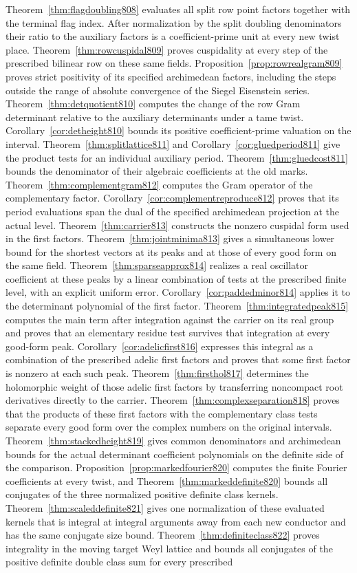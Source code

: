 \documentclass[a4paper,11pt]{article}
\theoremstyle{definition}
\theoremstyle{remark}
\numberwithin{equation}{section}
\begin{document}
Theorem~\ref{thm:flagdoubling808} evaluates all split row point factors together with the terminal flag index. After normalization by the split doubling denominators their ratio to the auxiliary factors is a coefficient-prime unit at every new twist place. Theorem~\ref{thm:rowcuspidal809} proves cuspidality at every step of the prescribed bilinear row on these same fields. Proposition~\ref{prop:rowrealgram809} proves strict positivity of its specified archimedean factors, including the steps outside the range of absolute convergence of the Siegel Eisenstein series. Theorem~\ref{thm:detquotient810} computes the change of the row Gram determinant relative to the auxiliary determinants under a tame twist. Corollary~\ref{cor:detheight810} bounds its positive coefficient-prime valuation on the interval. Theorem~\ref{thm:splitlattice811} and Corollary~\ref{cor:gluedperiod811} give the product tests for an individual auxiliary period. Theorem~\ref{thm:gluedcost811} bounds the denominator of their algebraic coefficients at the old marks. Theorem~\ref{thm:complementgram812} computes the Gram operator of the complementary factor. Corollary~\ref{cor:complementreproduce812} proves that its period evaluations span the dual of the specified archimedean projection at the actual level. Theorem~\ref{thm:carrier813} constructs the nonzero cuspidal form used in the first factors. Theorem~\ref{thm:jointminima813} gives a simultaneous lower bound for the shortest vectors at its peaks and at those of every good form on the same field. Theorem~\ref{thm:sparseapprox814} realizes a real oscillator coefficient at these peaks by a linear combination of tests at the prescribed finite level, with an explicit uniform error. Corollary~\ref{cor:paddedminor814} applies it to the determinant polynomial of the first factor. Theorem~\ref{thm:integratedpeak815} computes the main term after integration against the carrier on its real group and proves that an elementary residue test survives that integration at every good-form peak. Corollary~\ref{cor:adelicfirst816} expresses this integral as a combination of the prescribed adelic first factors and proves that some first factor is nonzero at each such peak. Theorem~\ref{thm:firsthol817} determines the holomorphic weight of those adelic first factors by transferring noncompact root derivatives directly to the carrier. Theorem~\ref{thm:complexseparation818} proves that the products of these first factors with the complementary class tests separate every good form over the complex numbers on the original intervals. Theorem~\ref{thm:stackedheight819} gives common denominators and archimedean bounds for the actual determinant coefficient polynomials on the definite side of the comparison. Proposition~\ref{prop:markedfourier820} computes the finite Fourier coefficients at every twist, and Theorem~\ref{thm:markeddefinite820} bounds all conjugates of the three normalized positive definite class kernels. Theorem~\ref{thm:scaleddefinite821} gives one normalization of these evaluated kernels that is integral at integral arguments away from each new conductor and has the same conjugate size bound. Theorem~\ref{thm:definiteclass822} proves integrality in the moving target Weyl lattice and bounds all conjugates of the positive definite double class sum for every prescribed 
\end{document}
